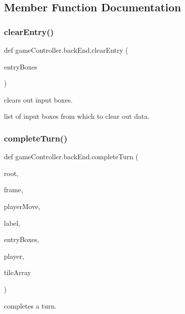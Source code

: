 \subsection{Member Function Documentation}
\mbox{\label{classgame_controller_1_1back_end_a5c400fe1c0ba7d4ca57ce19e1de77903}} 
\subsubsection{\texorpdfstring{clear\+Entry()}{clearEntry()}}
{\footnotesize\ttfamily def game\+Controller.\+back\+End.\+clear\+Entry (\begin{DoxyParamCaption}\item[{}]{entry\+Boxes }\end{DoxyParamCaption})}



clears out input boxes. 

list of input boxes from which to clear out data. \mbox{\label{classgame_controller_1_1back_end_a6f97fb6a72fa3af35d57bdb505656d65}} 
\subsubsection{\texorpdfstring{complete\+Turn()}{completeTurn()}}
{\footnotesize\ttfamily def game\+Controller.\+back\+End.\+complete\+Turn (\begin{DoxyParamCaption}\item[{}]{root,  }\item[{}]{frame,  }\item[{}]{player\+Move,  }\item[{}]{label,  }\item[{}]{entry\+Boxes,  }\item[{}]{player,  }\item[{}]{tile\+Array }\end{DoxyParamCaption})}



completes a turn. 

